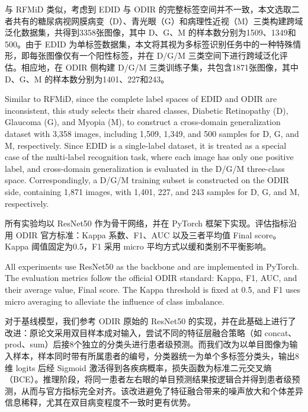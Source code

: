 与 RFMiD 类似，考虑到 EDID 与 ODIR 的完整标签空间并不一致，本文选取二者共有的糖尿病视网膜病变（D）、青光眼（G）和病理性近视（M）三类构建跨域泛化数据集，共得到3358张图像，其中 D、G、M 的样本数分别为1509、1349和500。由于 EDID 为单标签数据集，本文将其视为多标签识别任务中的一种特殊情形，即每张图像仅有一个阳性标签，并在 D/G/M 三类空间下进行跨域泛化评估。相应地，在 ODIR 侧构建 D/G/M 三类训练子集，共包含1871张图像，其中 D、G、M 的样本数分别为1401、227和243。

Similar to RFMiD, since the complete label spaces of EDID and ODIR are inconsistent, this study selects their shared classes, Diabetic Retinopathy (D), Glaucoma (G), and Myopia (M), to construct a cross-domain generalization dataset with 3,358 images, including 1,509, 1,349, and 500 samples for D, G, and M, respectively. Since EDID is a single-label dataset, it is treated as a special case of the multi-label recognition task, where each image has only one positive label, and cross-domain generalization is evaluated in the D/G/M three-class space. Correspondingly, a D/G/M training subset is constructed on the ODIR side, containing 1,871 images, with 1,401, 227, and 243 samples for D, G, and M, respectively.



所有实验均以 ResNet50 作为骨干网络，并在 PyTorch 框架下实现。评估指标沿用 ODIR 官方标准：Kappa 系数、F1、AUC 以及三者平均值 Final score。Kappa 阈值固定为0.5，F1 采用 micro 平均方式以缓和类别不平衡影响。

All experiments use ResNet50 as the backbone and are implemented in PyTorch. The evaluation metrics follow the official ODIR standard: Kappa, F1, AUC, and their average value, Final score. The Kappa threshold is fixed at 0.5, and F1 uses micro averaging to alleviate the influence of class imbalance.

对于基线模型，我们参考 ODIR 原始的 ResNet50 的实现，并在此基础上进行了改进：原论文采用双目样本成对输入，尝试不同的特征层融合策略（如 concat、prod、sum）后接8个独立的分类头进行患者级预测。而我们改为以单目图像为输入样本，样本同时带有所属患者的编号，分类器统一为单个多标签分类头，输出8维 logits 后经 Sigmoid 激活得到各疾病概率，损失函数为标准二元交叉熵（BCE）。推理阶段，将同一患者左右眼的单目预测结果按逻辑合并得到患者级预测，从而与官方指标完全对齐。该改进避免了特征融合带来的噪声放大和个体差异信息稀释，尤其在双目病变程度不一致时更有优势。

